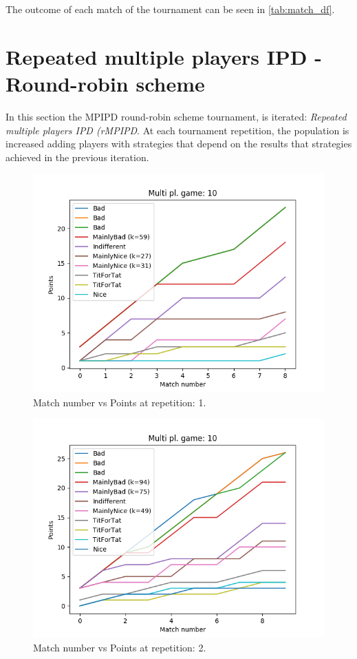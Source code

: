 \documentclass[journal,a4paper,10pt,twoside]{IEEEtran}
\begin{document}
The outcome of each match of the tournament can be seen in \autoref{tab:match_df}.

\newpage
\section{Repeated multiple players IPD - Round-robin scheme} \label{rIPDMP}
In this section the MPIPD round-robin scheme tournament, is iterated: \textit{Repeated multiple players IPD (rMPIPD}.
At each tournament repetition, the population is increased adding players with strategies that depend on the results that strategies achieved in the previous iteration. 

\begin{figure}
    \centering
    \includegraphics[width=1\columnwidth]{../img_v1/ridpmp-scores-10-r0.png}
    \caption{Match number vs Points at repetition: 1.}
    \label{fig:rmpipd1}
\end{figure}

\begin{figure}
    \centering
    \includegraphics[width=1\columnwidth]{../img_v1/ridpmp-scores-10-r1.png}
    \caption{Match number vs Points at repetition: 2.}
    \label{fig:rmpipd2}
\end{figure}
\end{document}

